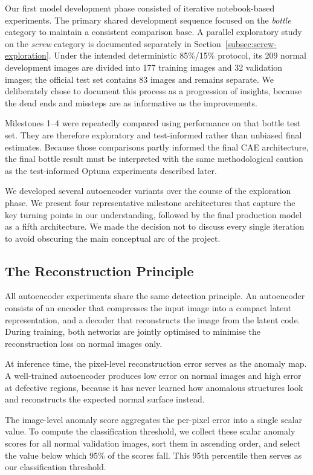 \documentclass[11pt, a4paper]{article}
\begin{document}
Our first model development phase consisted of iterative notebook-based experiments. The primary shared development sequence focused on the \textit{bottle} category
to maintain a consistent comparison base. A parallel exploratory study on the
\textit{screw} category is documented separately in Section~\ref{subsec:screw-exploration}. Under the intended deterministic 85\%/15\% protocol, its 209 normal development images are divided into 177 training images and 32 validation images; the official test set contains 83 images and remains separate. We deliberately chose to document this process as a progression of insights, because the dead ends and missteps are as informative as the improvements.

Milestones 1--4 were repeatedly compared using performance on that bottle test set. They are therefore exploratory and test-informed rather than unbiased final estimates. Because those comparisons partly informed the final CAE architecture, the final bottle result must be interpreted with the same methodological caution as the test-informed Optuna experiments described later.

We developed several autoencoder variants over the course of the exploration phase. We present four representative milestone architectures that capture the key turning points in our understanding, followed by the final production model as a fifth architecture. We made the decision not to discuss every single iteration to avoid obscuring the main conceptual arc of the project.

\subsection{The Reconstruction Principle}

All autoencoder experiments share the same detection principle. An autoencoder consists of an encoder that compresses the input image into a compact latent representation, and a decoder that reconstructs the image from the latent code. During training, both networks are jointly optimised to minimise the reconstruction loss on normal images only.

At inference time, the pixel-level reconstruction error serves as the anomaly map. A well-trained autoencoder produces low error on normal images and high error at defective regions, because it has never learned how anomalous structures look and reconstructs the expected normal surface instead. 

The image-level anomaly score aggregates the per-pixel error into a single scalar value. To compute the classification threshold, we collect these scalar anomaly scores for all normal validation images, sort them in ascending order, and select the value below which 95\% of the scores fall. This 95th percentile then serves as our classification threshold.
\end{document}
